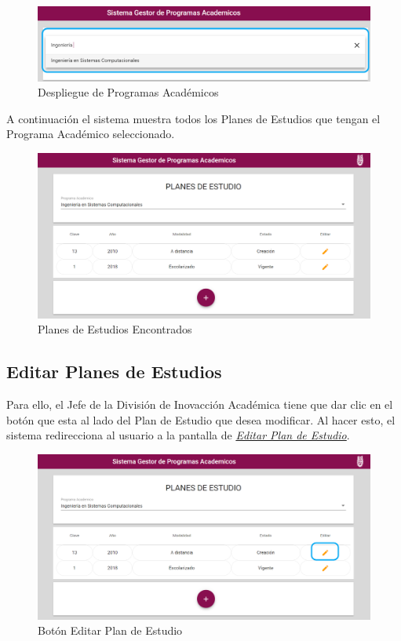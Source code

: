 \begin{figure}[H]
	\centering
	\hypertarget{academico2}{\includegraphics[width=0.7\linewidth]{images/SP4-GPE/programaD}}
	\caption{Despliegue de Programas Académicos}
	\label{academico2}
\end{figure}

A continuación el sistema muestra todos los Planes de Estudios que tengan el Programa Académico seleccionado.
\begin{figure}[H]
	\centering
	\hypertarget{planes}{\includegraphics[width=0.7\linewidth]{images/SP4-GPE/consultar}}
	\caption{Planes de Estudios Encontrados}
	\label{planes}
\end{figure}
\newpage
\subsection{Editar Planes de Estudios}

Para ello, el Jefe de la División de Inovacción Académica tiene que dar clic en el botón  que esta al lado del Plan de Estudio que desea modificar. Al hacer esto, el sistema redirecciona al usuario a la pantalla de \hyperlink{editarPE}{\textit{Editar Plan de Estudio}}.

\begin{figure}[H]
	\centering
	\hypertarget{editar}{\includegraphics[width=0.7\linewidth]{images/SP4-GPE/editarC}}
	\caption{Botón Editar Plan de Estudio}
	\label{editar}
\end{figure}

